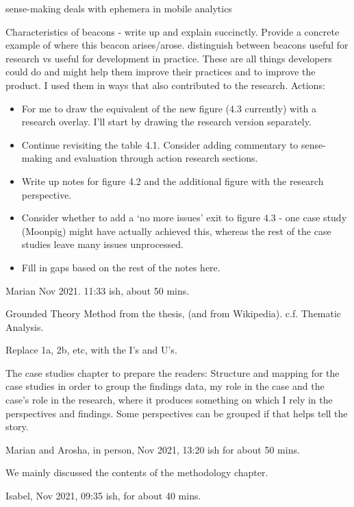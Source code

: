 sense-making deals with ephemera in mobile analytics 

Characteristics of beacons - write up and explain succinctly. Provide a concrete example of where this beacon arises/arose. distinguish between beacons useful for research vs useful for development in practice. These are all things developers could do and might help them improve their practices and to improve the product. I used them in ways that also contributed to the research.  
Actions: 
\begin{itemize}
    \item For me to draw the equivalent of the new figure (4.3 currently) with a research overlay. I'll start by drawing the research version separately. 
    \item Continue revisiting the table 4.1. Consider adding commentary to sense-making and evaluation through action research sections.
    \item Write up notes for figure 4.2 and the additional figure with the research perspective. 
    \item Consider whether to add a `no more issues' exit to figure 4.3 - one case study (Moonpig) might have actually achieved this, whereas the rest of the case studies leave many issues unprocessed.
    \item Fill in gaps based on the rest of the notes here.
\end{itemize}

\dotfill 

Marian  Nov 2021. 11:33 ish, about 50 mins.

Grounded Theory Method from the thesis, (and from Wikipedia). c.f. Thematic Analysis.

Replace 1a, 2b, etc, with the I's and U's.

The case studies chapter to prepare the readers:
Structure and mapping for the case studies in order to group the findings 
data, my role in the case and the case's role in the research, where it produces something on which I rely in the perspectives and findings. Some perspectives can be grouped if that helps tell the story.

\dotfill

Marian and Arosha, in person,  Nov 2021, 13:20 ish for about 50 mins.

We mainly discussed the contents of the methodology chapter.

\dotfill

Isabel,  Nov 2021, 09:35 ish, for about 40 mins. 

